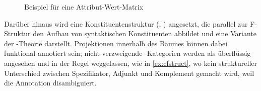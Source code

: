 \begin{figure}
\centering
	{
	}
\caption[Beispiel für eine Attribut-Wert-Matrix]{Beispiel für eine Attribut-Wert-Matrix \autocite[adaptiert aus][206--207]{mueller2020}}
\label{ex:avm}
\end{figure}

Darüber hinaus wird eine Konstituentenstruktur (,
) angesetzt, die parallel zur F-Struktur den Aufbau von
syntaktischen Konstituenten abbildet und eine Variante der -Theorie
\autocites{chomsky1970,jackendoff1977} darstellt. Projektionen innerhalb des
Baumes können dabei funktional annotiert sein; nicht-verzweigende
-Kategorien werden als überflüssig angesehen und in der Regel
weggelassen, wie in \cref{ex:cfstruct}, wo kein struktureller Unterschied
zwischen Spezifikator, Adjunkt und Komplement gemacht wird, weil die Annotation
disambiguiert.

